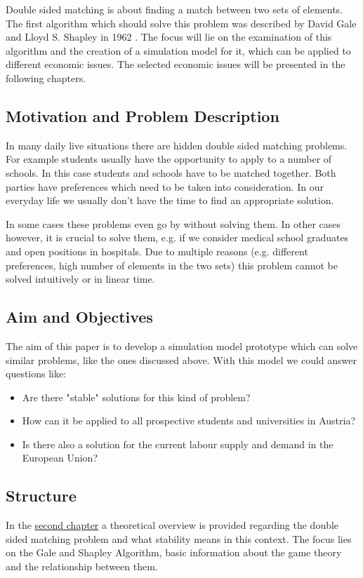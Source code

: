 \label{introduction}
Double sided matching is about finding a match between two sets of elements.
The first algorithm which should solve this problem was described by David Gale and Lloyd S. Shapley in 1962 \cite{gale62a}. 
The focus will lie on the examination of this algorithm and the creation of a simulation model for it, which can be applied to different economic issues.
The selected economic issues will be presented in the following chapters. 

\subsection{Motivation and Problem Description}
In many daily live situations there are hidden double sided matching problems. 
For example students usually have the opportunity to apply to a number of schools. 
In this case students and schools have to be matched together. 
Both parties have preferences which need to be taken into consideration. 
In our everyday life we usually don't have the time to find an appropriate solution. 

In some cases these problems even go by without solving them. 
In other cases however, it is crucial to solve them, e.g. if we consider medical school graduates and open positions in hospitals. 
Due to multiple reasons (e.g. different preferences, high number of elements in the two sets) this problem cannot be solved intuitively or in linear time.

\subsection{Aim and Objectives}
The aim of this paper is to develop a simulation model prototype which can solve similar problems, like the ones discussed above.
With this model we could answer questions like:
\begin{itemize}
	\item Are there "stable" solutions for this kind of problem?
	\item How can it be applied to all prospective students and universities in Austria?
	\item Is there also a solution for the current labour supply and demand in the European Union?
\end{itemize}

\subsection{Structure}
In the \hyperref[theory]{second chapter} a theoretical overview is provided regarding the double sided matching problem and what stability means in this context.
The focus lies on the Gale and Shapley Algorithm, basic information about the game theory and the relationship between them.

